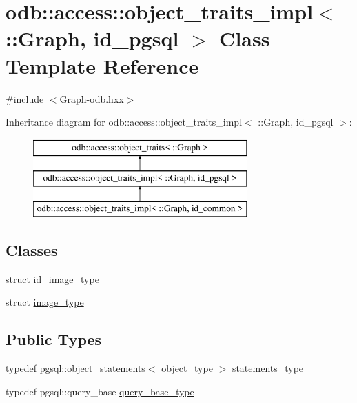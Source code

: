 \hypertarget{classodb_1_1access_1_1object__traits__impl_3_01_1_1_graph_00_01id__pgsql_01_4}{}\section{odb\+:\+:access\+:\+:object\+\_\+traits\+\_\+impl$<$ \+:\+:Graph, id\+\_\+pgsql $>$ Class Template Reference}
\label{classodb_1_1access_1_1object__traits__impl_3_01_1_1_graph_00_01id__pgsql_01_4}


{\ttfamily \#include $<$Graph-\/odb.\+hxx$>$}

Inheritance diagram for odb\+:\+:access\+:\+:object\+\_\+traits\+\_\+impl$<$ \+:\+:Graph, id\+\_\+pgsql $>$\+:\begin{figure}[H]
\begin{center}
\leavevmode
\includegraphics[height=3.000000cm]{d0/d29/classodb_1_1access_1_1object__traits__impl_3_01_1_1_graph_00_01id__pgsql_01_4}
\end{center}
\end{figure}
\subsection*{Classes}
\begin{DoxyCompactItemize}
\item 
struct \hyperlink{structodb_1_1access_1_1object__traits__impl_3_01_1_1_graph_00_01id__pgsql_01_4_1_1id__image__type}{id\+\_\+image\+\_\+type}
\item 
struct \hyperlink{structodb_1_1access_1_1object__traits__impl_3_01_1_1_graph_00_01id__pgsql_01_4_1_1image__type}{image\+\_\+type}
\end{DoxyCompactItemize}
\subsection*{Public Types}
\begin{DoxyCompactItemize}
\item 
typedef pgsql\+::object\+\_\+statements$<$ \hyperlink{classodb_1_1access_1_1object__traits_3_01_1_1_graph_01_4_afa0cff44a76673f5041354954c384561}{object\+\_\+type} $>$ \hyperlink{classodb_1_1access_1_1object__traits__impl_3_01_1_1_graph_00_01id__pgsql_01_4_a5554ddaea23c61328234f3a79ed49cb1}{statements\+\_\+type}
\item 
typedef pgsql\+::query\+\_\+base \hyperlink{classodb_1_1access_1_1object__traits__impl_3_01_1_1_graph_00_01id__pgsql_01_4_a6d91ed0e32ffb82b1f1d7bd71da6526f}{query\+\_\+base\+\_\+type}
\end{DoxyCompactItemize}
